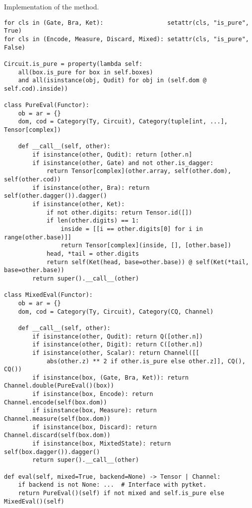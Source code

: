 \begin{python}
{\normalfont Implementation of the  method.}

\begin{verbatim}
for cls in (Gate, Bra, Ket):                  setattr(cls, "is_pure", True)
for cls in (Encode, Measure, Discard, Mixed): setattr(cls, "is_pure", False)

Circuit.is_pure = property(lambda self:
    all(box.is_pure for box in self.boxes)
    and all(isinstance(obj, Qudit) for obj in (self.dom @ self.cod).inside))

class PureEval(Functor):
    ob = ar = {}
    dom, cod = Category(Ty, Circuit), Category(tuple[int, ...], Tensor[complex])

    def __call__(self, other):
        if isinstance(other, Qudit): return [other.n]
        if isinstance(other, Gate) and not other.is_dagger:
            return Tensor[complex](other.array, self(other.dom), self(other.cod))
        if isinstance(other, Bra): return self(other.dagger()).dagger()
        if isinstance(other, Ket):
            if not other.digits: return Tensor.id([])
            if len(other.digits) == 1:
                inside = [[i == other.digits[0] for i in range(other.base)]]
                return Tensor[complex](inside, [], [other.base])
            head, *tail = other.digits
            return self(Ket(head, base=other.base)) @ self(Ket(*tail, base=other.base))
        return super().__call__(other)

class MixedEval(Functor):
    ob = ar = {}
    dom, cod = Category(Ty, Circuit), Category(CQ, Channel)

    def __call__(self, other):
        if isinstance(other, Qudit): return Q([other.n])
        if isinstance(other, Digit): return C([other.n])
        if isinstance(other, Scalar): return Channel([[
            abs(other.z) ** 2 if other.is_pure else other.z]], CQ(), CQ())
        if isinstance(box, (Gate, Bra, Ket)): return Channel.double(PureEval()(box))
        if isinstance(box, Encode): return Channel.encode(self(box.dom))
        if isinstance(box, Measure): return Channel.measure(self(box.dom))
        if isinstance(box, Discard): return Channel.discard(self(box.dom))
        if isinstance(box, MixtedState): return self(box.dagger()).dagger()
        return super().__call__(other)

def eval(self, mixed=True, backend=None) -> Tensor | Channel:
    if backend is not None: ...  # Interface with pytket.
    return PureEval()(self) if not mixed and self.is_pure else MixedEval()(self)
\end{verbatim}
\end{python}

